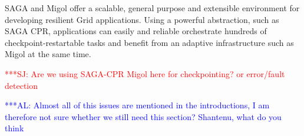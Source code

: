\documentclass{rspublic}
\newcommand{\alnote}[1]{ {\textcolor{blue} { ***AL: #1 }}}
\newcommand{\jhanote}[1]{ {\textcolor{red} { ***SJ: #1 }}}
\newcommand{\alnote}[1]{}
\newcommand{\jhanote}[1]{}
\begin{document}
SAGA and Migol offer a scalable, general purpose and extensible
environment for developing resilient Grid applications.  Using a
powerful abstraction, such as SAGA CPR, applications can easily and
reliable orchestrate hundreds of checkpoint-restartable tasks and
benefit from an adaptive infrastructure such as Migol at the same
time.

\jhanote{Are we using SAGA-CPR Migol here for checkpointing? or
  error/fault detection}

\alnote{Almost all of this issues are mentioned in the introductions,
  I am therefore not sure whether we still need this section?
  Shantenu, what do you think}

% 
%                  
\end{document}

